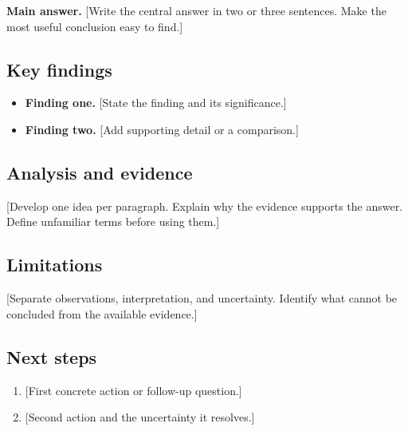\documentclass[11pt,letterpaper]{article}
\begin{document}
\begin{responsemessage}
\textbf{Main answer.} [Write the central answer in two or three sentences.
Make the most useful conclusion easy to find.]

\subsection*{Key findings}
\begin{itemize}
  \item \textbf{Finding one.} [State the finding and its significance.]
  \item \textbf{Finding two.} [Add supporting detail or a comparison.]
\end{itemize}

\subsection*{Analysis and evidence}
[Develop one idea per paragraph. Explain why the evidence supports the
answer. Define unfamiliar terms before using them.]


\subsection*{Limitations}
[Separate observations, interpretation, and uncertainty. Identify what
cannot be concluded from the available evidence.]

\subsection*{Next steps}
\begin{enumerate}
  \item {[First concrete action or follow-up question.]}
  \item {[Second action and the uncertainty it resolves.]}
\end{enumerate}
\end{responsemessage}
\end{document}
